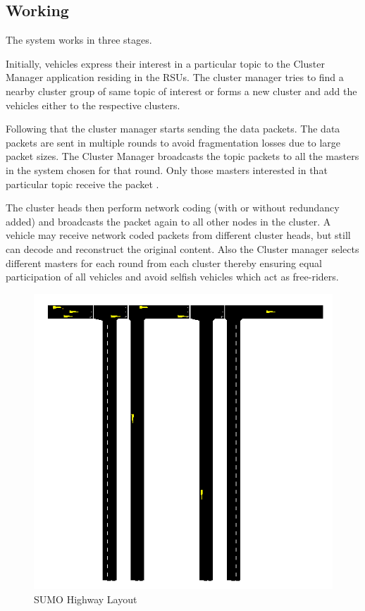 \documentclass{acm_proc_article-sp}
\begin{document}
\subsection{Working}
The system works in three stages. 

Initially, vehicles express their interest in a particular topic to the Cluster Manager application residing in the RSUs. The cluster manager tries to find a nearby cluster group of same topic of interest or forms a new cluster and add the vehicles either to the respective clusters. 

Following that the cluster manager starts sending the data packets. The data packets are sent in multiple rounds to avoid fragmentation losses due to large packet sizes. The Cluster Manager broadcasts the topic packets to all the masters in the system chosen for that round. Only those masters interested in that particular topic receive the packet . 

The cluster heads then perform network coding (with or without redundancy added) and broadcasts the packet again to all other nodes in the cluster. A vehicle may receive network coded packets from different cluster heads, but still can decode and reconstruct the original content. Also the Cluster manager selects different masters for each round from each cluster thereby ensuring equal participation of all vehicles and avoid selfish vehicles which act as free-riders.  

\begin{figure}
\centering
\includegraphics[scale=.40]{sumo.png} \caption{SUMO Highway Layout}
\label{sumo}
\end{figure}
\end{document}
